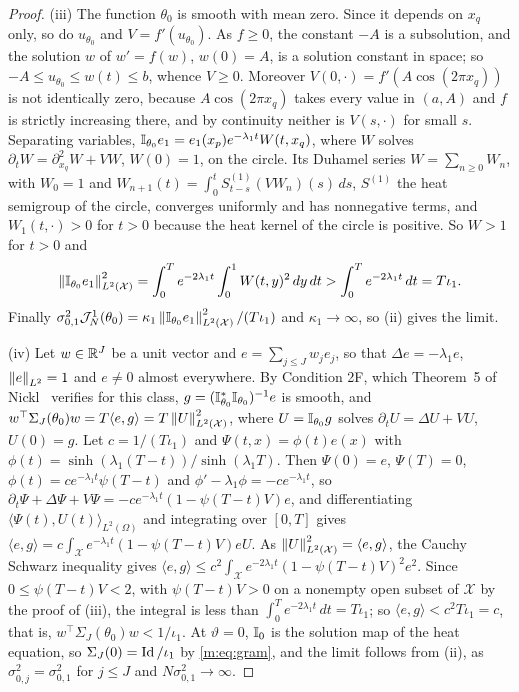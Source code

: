 \begin{proof}
(iii) The function $\theta_0$ is smooth with mean zero. Since it depends on $x_q$ only, so do $u_{\theta_0}$ and $V=f'(u_{\theta_0})$. As $f\ge0$, the constant $-A$ is a subsolution, and the solution $w$ of $w'=f(w)$, $w(0)=A$, is a solution constant in space; so $-A\le u_{\theta_0}\le w(t)\le b$, whence $V\ge0$. Moreover $V(0,\cdot)=f'(A\cos(2\pi x_q))$ is not identically zero, because $A\cos(2\pi x_q)$ takes every value in $(a,A)$ and $f$ is strictly increasing there, and by continuity neither is $V(s,\cdot)$ for small $s$. Separating variables, $\mathbb{I}_{\theta_0}e_1=e_1(x_p)e^{-\lambda_1t}W(t,x_q)$, where $W$ solves $\partial_tW=\partial^2_{x_q}W+VW$, $W(0)=1$, on the circle. Its Duhamel series $W=\sum_{n\ge0}W_n$, with $W_0=1$ and $W_{n+1}(t)=\int_0^tS^{(1)}_{t-s}(VW_n)(s)\,ds$, $S^{(1)}$ the heat semigroup of the circle, converges uniformly and has nonnegative terms, and $W_1(t,\cdot)>0$ for $t>0$ because the heat kernel of the circle is positive. So $W>1$ for $t>0$ and
\[
\left\|\mathbb{I}_{\theta_0}e_1\right\|^2_{L^2(\mathcal X)}=\int_0^Te^{-2\lambda_1t}\int_0^1W(t,y)^2\,dy\,dt>\int_0^Te^{-2\lambda_1t}\,dt=T\iota_1 .
\]
Finally $\sigma^2_{0,1}\mathcal J^1_N(\theta_0)=\kappa_1\left\|\mathbb{I}_{\theta_0}e_1\right\|^2_{L^2(\mathcal X)}/(T\iota_1)$ and $\kappa_1\to\infty$, so (ii) gives the limit.

(iv) Let $w\in\mathbb{R}^J$ be a unit vector and $e=\sum_{j\le J}w_je_j$, so that $\Delta e=-\lambda_1e$, $\left\|e\right\|_{L^2}=1$ and $e\ne0$ almost everywhere. By Condition 2F, which Theorem~5 of Nickl~\cite{nicklbvm2024} verifies for this class, $g=(\mathbb{I}^*_{\theta_0}\mathbb{I}_{\theta_0})^{-1}e$ is smooth, and $w^\top\Sigma_J(\theta_0)w=T\langle e,g\rangle=T\left\|U\right\|^2_{L^2(\mathcal X)}$, where $U=\mathbb{I}_{\theta_0}g$ solves $\partial_tU=\Delta U+VU$, $U(0)=g$. Let $c=1/(T\iota_1)$ and $\Psi(t,x)=\phi(t)e(x)$ with $\phi(t)=\sinh(\lambda_1(T-t))/\sinh(\lambda_1T)$. Then $\Psi(0)=e$, $\Psi(T)=0$, $\phi(t)=ce^{-\lambda_1t}\psi(T-t)$ and $\phi'-\lambda_1\phi=-ce^{-\lambda_1t}$, so $\partial_t\Psi+\Delta\Psi+V\Psi=-ce^{-\lambda_1t}(1-\psi(T-t)V)e$, and differentiating $\langle\Psi(t),U(t)\rangle_{L^2(\Omega)}$ and integrating over $[0,T]$ gives $\langle e,g\rangle=c\int_{\mathcal X}e^{-\lambda_1t}(1-\psi(T-t)V)eU$. As $\left\|U\right\|^2_{L^2(\mathcal X)}=\langle e,g\rangle$, the Cauchy Schwarz inequality gives $\langle e,g\rangle\le c^2\int_{\mathcal X}e^{-2\lambda_1t}(1-\psi(T-t)V)^2e^2$. Since $0\le\psi(T-t)V<2$, with $\psi(T-t)V>0$ on a nonempty open subset of $\mathcal X$ by the proof of (iii), the integral is less than $\int_0^Te^{-2\lambda_1t}\,dt=T\iota_1$; so $\langle e,g\rangle<c^2T\iota_1=c$, that is, $w^\top\Sigma_J(\theta_0)w<1/\iota_1$. At $\vartheta=0$, $\mathbb{I}_0$ is the solution map of the heat equation, so $\Sigma_J(0)=\operatorname{Id}/\iota_1$ by \eqref{m:eq:gram}, and the limit follows from (ii), as $\sigma^2_{0,j}=\sigma^2_{0,1}$ for $j\le J$ and $N\sigma^2_{0,1}\to\infty$.
\end{proof}

